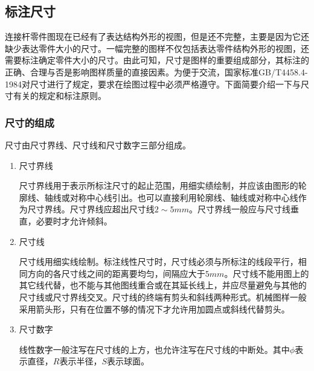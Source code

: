 \subsection{标注尺寸}

连接杆零件图现在已经有了表达结构外形的视图，但是还不完整，主要是因为它还缺少表达零件大小的尺寸。一幅完整的图样不仅包括表达零件结构外形的视图，还需要标注确定零件大小的尺寸。由此可知，尺寸是图样的重要组成部分，其标注的正确、合理与否是影响图样质量的直接因素。为便于交流，国家标准GB/T4458.4-1984对尺寸进行了规定，要求在绘图过程中必须严格遵守。下面简要介绍一下与尺寸有关的规定和标注原则。

\subsubsection{尺寸的组成}
尺寸由尺寸界线、尺寸线和尺寸数字三部分组成。
\begin{enumerate}
\item 尺寸界线

尺寸界线用于表示所标注尺寸的起止范围，用细实绩绘制，并应该由图形的轮廓线、轴线或对称中心线引出。也可以直接利用轮廓线、轴线或对称中心线作为尺寸界线。尺寸界线应超出尺寸线$2\sim 5mm$。尺寸界线一般应与尺寸线垂直，必要时才允许倾斜。
\item 尺寸线

尺寸线用细实线绘制。标注线性尺寸时，尺寸线必须与所标注的线段平行，相同方向的各尺寸线之间的距离要均匀，间隔应大于$5mm$。尺寸线不能用图上的其它线代替，也不能与其他图线重合或在其延长线上，并应尽量避免与其他的尺寸线或尺寸界线交叉。尺寸线的终端有剪头和斜线两种形式。机械图样一般采用箭头形，只有在位置不够的情况下才允许用加圆点或斜线代替剪头。
\item 尺寸数字

线性数字一般注写在尺寸线的上方，也允许注写在尺寸线的中断处。其中$\phi $表示直径，$R$表示半径，$S$表示球面。
\end{enumerate} 

